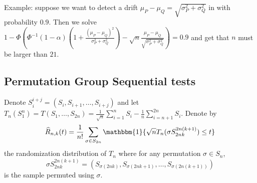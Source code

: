 \documentclass{article}
\theoremstyle{plain}
\theoremstyle{remark}
\newcommand{\1}{\mathbbm{1}}
\numberwithin{equation}{section}
\begin{document}
Example: suppose we want to detect a drift $\mu_P-\mu_Q=\sqrt{\sigma_P^2+\sigma_Q^2}$ in with probability $0.9$. Then we solve $1-\Phi\left(\Phi^{-1}(1-\alpha)\left(1+\frac{(\mu_P-\mu_Q)^2}{\sigma_P^2+\sigma_Q^2 }\right)-  \sqrt{n}\frac{\mu_P-\mu_Q}{\sqrt{\sigma_P^2+\sigma_Q^2}} \right) = 0.9$ and get that $n$ must be larger than $21$.

\subsection{Permutation Group Sequential tests}

Denote $S_{i}^{i+j}=(S_i, S_{i+1},\dots, S_{i+j})$ and let $T_n(S_1^n)=T(S_1,\dots,S_{2n})=\frac{1}{\sqrt{n}}\sum_{i=1}^n S_i -\frac{1}{n}\sum_{i=n+1}^{2n} S_i$. Denote by
$$\widehat{R}_{n,k}(t)=\frac{1}{n!}\sum_{\sigma \in S_{2n}} \1\{\sqrt{n}T_n(\sigma S_{2nk}^{2n(k+1)}) \le t\} $$
the randomization distribution of $T_n$ where for any permutation $\sigma \in S_n$,
$$\sigma S_{2nk}^{2n(k+1)}=(S_{\sigma(2nk)},S_{\sigma(2nk+1)},\dots,S_{\sigma(2n(k+1))})$$
is the sample permuted using $ \sigma$.


\end{document}
